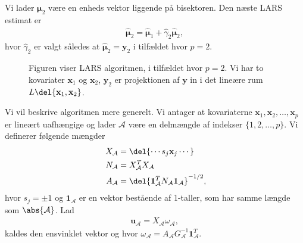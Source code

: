  Vi lader $\boldsymbol{\mu}_2$ være en enheds vektor liggende på bisektoren. Den næste LARS estimat er 
 \begin{align*}
 \boldsymbol{\widehat{\mu}}_2 = \boldsymbol{\widehat{\mu}}_1+ \widehat{\gamma}_2 \boldsymbol{\widehat{\mu}}_2,
 \end{align*}
%
hvor $\widehat{\gamma}_2$ er valgt således at  $ \boldsymbol{\widehat{\mu}}_2 = \textbf{y}_2$ i tilfældet hvor $p = 2$. 
%
\begin{figure}[H]
\centering
\scalebox{0.8}{}
\caption{Figuren viser LARS algoritmen, i tilfældet hvor $p = 2$. Vi har to kovariater  $\textbf{x}_1$ og $\textbf{x}_2$, $\textbf{y}_2$ er projektionen af $\textbf{y}$ in i det lineære rum $L  \del{ \textbf{x}_1, \textbf{x}_2} $. }\label{fig:lars}
\end{figure}
%
Vi vil beskrive algoritmen mere generelt.
Vi antager at kovariaterne $ \textbf{x}_1,  \textbf{x}_2,  \dots,  \textbf{x}_p$ er lineært uafhængige og lader $\mathcal{A}$ være en delmængde af indekser $\{1, 2, \dots, p \}$. 
Vi definerer følgende mængder 
%
\begin{align*}
X_{\mathcal{A}} & = \del{\cdots s_j \textbf{x}_j \cdots}  \nonumber \\ 
N_{\mathcal{A}} & = X^T_{\mathcal{A}} X_{\mathcal{A}} \\ \
A_{\mathcal{A}} & = \del{ \textbf{1}^T_{\mathcal{A}} N_{\mathcal{A}} \textbf{1}_{\mathcal{A}} }^{- 1/2} , \nonumber 
\end{align*}
%
hvor  $s_j = \pm 1$ og $\textbf{1}_{\mathcal{A}} $ er en vektor bestående af 1-taller, som har samme længde som $\abs{\mathcal{A}}$. 
Lad 
%
\begin{align*}
\textbf{u}_{\mathcal{A}} = X_{\mathcal{A}} \omega_{\mathcal{A}}, 
\end{align*}
%
kaldes den ensvinklet vektor og hvor $ \omega_{\mathcal{A}} = A_{\mathcal{A}} G^{-1}_{\mathcal{A}}  \textbf{1}^T_{\mathcal{A}}$. 

